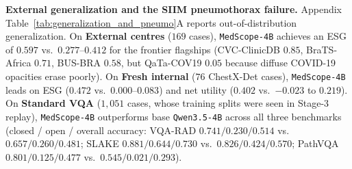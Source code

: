 \documentclass{article} %
\begin{document}
\textbf{External generalization and the SIIM pneumothorax failure.} Appendix Table~\ref{tab:generalization_and_pneumo}A reports out-of-distribution generalization. On \textbf{External centres} ($169$ cases), \texttt{MedScope-4B} achieves an ESG of $0.597$ vs.\ $0.277\text{--}0.412$ for the frontier flagships (CVC-ClinicDB $0.85$, BraTS-Africa $0.71$, BUS-BRA $0.58$, but QaTa-COV19 $0.05$ because diffuse COVID-19 opacities erase poorly). On \textbf{Fresh internal} ($76$ ChestX-Det cases), \texttt{MedScope-4B} leads on ESG ($0.472$ vs.\ $0.000\text{--}0.083$) and net utility ($0.402$ vs.\ $-0.023$ to $0.219$). On \textbf{Standard VQA} ($1,051$ cases, whose training splits were seen in Stage-3 replay), \texttt{MedScope-4B} outperforms base \texttt{Qwen3.5-4B} across all three benchmarks (closed / open / overall accuracy: VQA-RAD $0.741 / 0.230 / 0.514$ vs.\ $0.657 / 0.260 / 0.481$; SLAKE $0.881 / 0.644 / 0.730$ vs.\ $0.826 / 0.424 / 0.570$; PathVQA $0.801 / 0.125 / 0.477$ vs.\ $0.545 / 0.021 / 0.293$).
\end{document}
